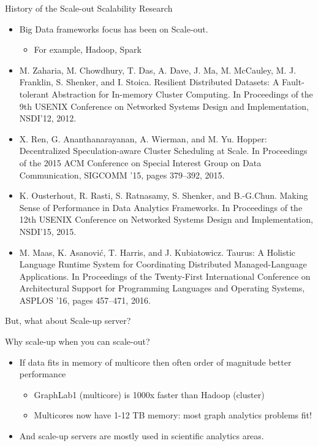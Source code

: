 \documentclass[english]{beamer} %
\begin{document}
\begin{frame}{History of the Scale-out Scalability Research}
    \begin{itemize}
    \item Big Data frameworks focus has been on Scale-out.
        \begin{itemize}
            \item For example, Hadoop, Spark 
        \end{itemize}
    \item \tiny{M. Zaharia, M. Chowdhury, T. Das, A. Dave, J. Ma, M. McCauley,
    M. J.
    Franklin, S. Shenker, and I. Stoica.
    Resilient Distributed Datasets: A Fault-tolerant Abstraction for In-memory
    Cluster Computing. In Proceedings of the 9th USENIX Conference on Networked
    Systems Design and Implementation, NSDI’12, 2012.}
    \item X. Ren, G. Ananthanarayanan, A. Wierman, and M. Yu. Hopper:
     Decentralized Speculation-aware Cluster Scheduling at Scale. In Proceedings
    of the 2015 ACM Conference on Special Interest Group on Data Communication,
    SIGCOMM ’15, pages 379–392, 2015.
    \item K. Ousterhout, R. Rasti, S. Ratnasamy, S. Shenker, and B.-G.Chun.
    Making Sense of Performance in Data Analytics Frameworks. In Proceedings of the
    12th USENIX Conference on Networked Systems Design and Implementation,
    NSDI’15, 2015.
    \item M. Maas, K. Asanović, T. Harris, and J. Kubiatowicz. Taurus: A
    Holistic Language Runtime System for Coordinating Distributed Managed-Language
    Applications. In Proceedings of the Twenty-First International Conference on
    Architectural Support for Programming Languages and Operating Systems,
    ASPLOS ’16, pages 457–471, 2016.
    \end{itemize}
\end{frame}

\begin{frame}{But, what about Scale-up server?}
\end{frame}

\begin{frame}{Why scale-up when you can scale-out?}
    \begin{itemize}
    \item If data fits in memory of multicore then often order of magnitude
    better performance
        \begin{itemize}
            \item GraphLab1 (multicore) is 1000x faster than Hadoop (cluster)
            \item Multicores now have 1-12 TB memory: most graph analytics
            problems fit!
        \end{itemize}
    \item And scale-up servers are mostly used in scientific analytics areas.
    \end{itemize}
\end{frame}
\end{document}
